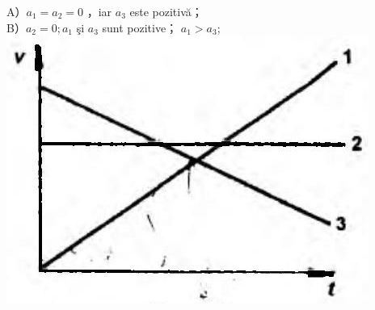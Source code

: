 \documentclass[10pt]{article}
\begin{document}
A）$a_{1}=a_{2}=0$ ，iar $a_{3}$ este pozitivă；\\
B）$a_{2}=0 ; a_{1}$ şi $a_{3}$ sunt pozitive； $a_{1}>a_{3} ;$\\
\includegraphics[max width=\textwidth, center]{2025_07_01_5b3ff9fa0d508c8e9f17g-025}
\end{document}
